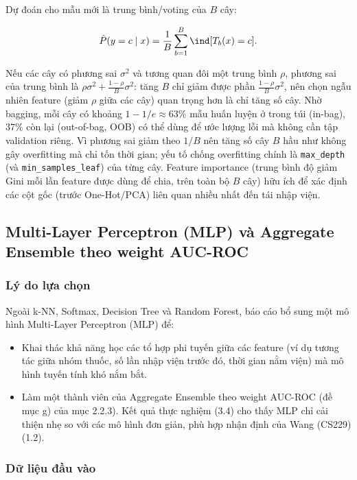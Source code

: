 \documentclass[a4paper]{report}
\begin{document}
Dự đoán cho mẫu mới là trung bình/voting của $B$ cây:

\begin{equation}
  \hat{P}(y=c\mid x) = \frac{1}{B}\sum_{b=1}^{B} \ind[T_b(x) = c].
\end{equation}

Nếu các cây có phương sai $\sigma^2$ và tương quan đôi một trung bình $\rho$, phương sai của trung bình là $\rho\sigma^2 + \frac{1-\rho}{B}\sigma^2$: tăng $B$ chỉ giảm được phần $\frac{1-\rho}{B}\sigma^2$, nên chọn ngẫu nhiên feature (giảm $\rho$ giữa các cây) quan trọng hơn là chỉ tăng số cây. Nhờ bagging, mỗi cây có khoảng $1-1/e\approx 63\%$ mẫu huấn luyện ở trong túi (in-bag), $37\%$ còn lại (out-of-bag, OOB) có thể dùng để ước lượng lỗi mà không cần tập validation riêng. Vì phương sai giảm theo $1/B$ nên tăng số cây $B$ hầu như không gây overfitting mà chỉ tốn thời gian; yếu tố chống overfitting chính là \texttt{max\_\allowbreak{}depth} (và \texttt{min\_\allowbreak{}samples\_\allowbreak{}leaf}) của từng cây. Feature importance (trung bình độ giảm Gini mỗi lần feature được dùng để chia, trên toàn bộ $B$ cây) hữu ích để xác định các cột gốc (trước One-Hot/PCA) liên quan nhiều nhất đến tái nhập viện.

\subsection{Multi-Layer Perceptron (MLP) và Aggregate Ensemble theo weight AUC-ROC}

\subsubsection{Lý do lựa chọn}

Ngoài k-NN, Softmax, Decision Tree và Random Forest, báo cáo bổ sung một mô hình Multi-Layer Perceptron (MLP) để:

\begin{itemize}
  \item Khai thác khả năng học các tổ hợp phi tuyến giữa các feature (ví dụ tương tác giữa nhóm thuốc, số lần nhập viện trước đó, thời gian nằm viện) mà mô hình tuyến tính khó nắm bắt.
  \item Làm một thành viên của Aggregate Ensemble theo weight AUC-ROC (đề mục g) của mục 2.2.3). Kết quả thực nghiệm (3.4) cho thấy MLP chỉ cải thiện nhẹ so với các mô hình đơn giản, phù hợp nhận định của Wang (CS229) \cite{tl8} (1.2).
\end{itemize}

\subsubsection{Dữ liệu đầu vào}
\end{document}
